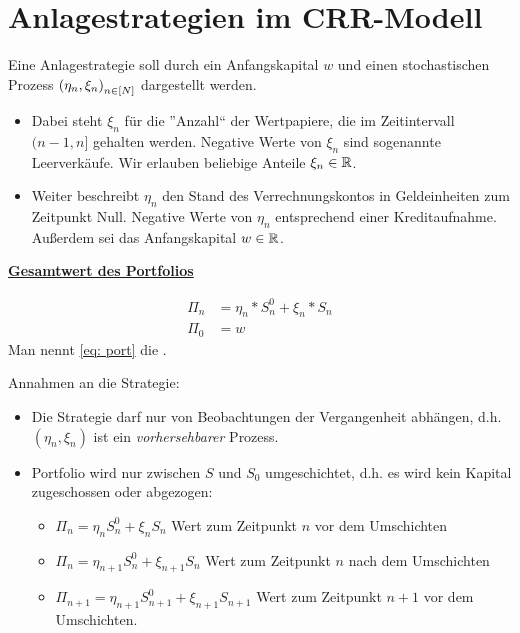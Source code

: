 \section{Anlagestrategien im CRR-Modell}

Eine Anlagestrategie soll durch ein Anfangskapital $w$ und einen stochastischen Prozess $\left( \eta_n, \xi_n \right)_{n \in [N]}$ dargestellt werden. 
\begin{itemize}
	\item Dabei steht $\xi_n$ für die ''Anzahl`` der Wertpapiere, die im Zeitintervall $(n-1,n]$ gehalten werden. Negative Werte von $\xi_n$ sind sogenannte Leerverkäufe. Wir erlauben beliebige Anteile $\xi_n \in \mathbb{R}$.
	\item Weiter beschreibt $\eta_n$ den Stand des Verrechnungskontos in Geldeinheiten zum Zeitpunkt Null. Negative Werte von $\eta_n$ entsprechend einer Kreditaufnahme.
	Außerdem sei das Anfangskapital $w \in \mathbb{R}$.
\end{itemize}

\textbf{\underline{Gesamtwert des Portfolios}}

\begin{equation*}
\begin{aligned}
\Pi_n &= \eta_n * S_n^0 + \xi_n * S_n \\
\Pi_0 &= w
\end{aligned} \tag{Port} \label{eq: port}
\end{equation*}
Man nennt \eqref{eq: port} die .

Annahmen an die Strategie:
\begin{itemize}
	\item Die Strategie darf nur von Beobachtungen der Vergangenheit abhängen, d.h. $(\eta_n, \xi_n)$ ist ein \textit{vorhersehbarer} Prozess.
	\item Portfolio wird nur zwischen $S$ und $S_0$ umgeschichtet, d.h. es wird kein Kapital zugeschossen oder abgezogen:
	\begin{itemize}
		\item $\Pi_n = \eta_n S_n^0 + \xi_n S_n$ Wert zum Zeitpunkt $n$ vor dem Umschichten
		\item $\Pi_n = \eta_{n+1} S_n^0 + \xi_{n+1}S_n$ Wert zum Zeitpunkt $n$ nach dem Umschichten
		\item $\Pi_{n+1} = \eta_{n+1} S_{n+1}^0 + \xi_{n+1} S_{n+1}$ Wert zum Zeitpunkt $n+1$ vor dem Umschichten.
	\end{itemize}
\end{itemize}

